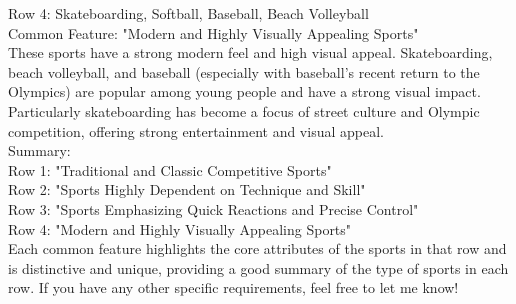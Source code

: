 \documentclass{mcmthesis}
\begin{document}
\begin{enumerate}
\begin{description}
Row 4: Skateboarding, Softball, Baseball, Beach Volleyball\\
Common Feature: "Modern and Highly Visually Appealing Sports"\\
These sports have a strong modern feel and high visual appeal. Skateboarding, beach volleyball, and baseball (especially with baseball's recent return to the Olympics) are popular among young people and have a strong visual impact. Particularly skateboarding has become a focus of street culture and Olympic competition, offering strong entertainment and visual appeal.\\
Summary:\\
Row 1: "Traditional and Classic Competitive Sports"\\
Row 2: "Sports Highly Dependent on Technique and Skill"\\
Row 3: "Sports Emphasizing Quick Reactions and Precise Control"\\
Row 4: "Modern and Highly Visually Appealing Sports"\\
Each common feature highlights the core attributes of the sports in that row and is distinctive and unique, providing a good summary of the type of sports in each row. If you have any other specific requirements, feel free to let me know!\\


\end{description}
\end{enumerate}
\end{document}
